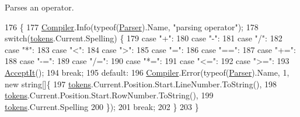 Parses an operator. 
\begin{DoxyCode}
176                                                    \{
177                         \mbox{\hyperlink{namespace_compiler}{Compiler}}.Info(typeof(\mbox{\hyperlink{class_compiler_1_1_parser_a450e11452db3f91ff866fc1e36ebc79d}{Parser}}).Name, \textcolor{stringliteral}{"parsing operator"});
178                         \textcolor{keywordflow}{switch}(\mbox{\hyperlink{class_compiler_1_1_parser_a4db075175c853a197c7b8db7d787a0a5}{tokens}}.Current.Spelling) \{
179                             \textcolor{keywordflow}{case} \textcolor{stringliteral}{"+"}:
180                             \textcolor{keywordflow}{case} \textcolor{stringliteral}{"-"}:
181                             \textcolor{keywordflow}{case} \textcolor{stringliteral}{"/"}:
182                             \textcolor{keywordflow}{case} \textcolor{stringliteral}{"*"}:
183                             \textcolor{keywordflow}{case} \textcolor{stringliteral}{"<"}:
184                             \textcolor{keywordflow}{case} \textcolor{stringliteral}{">"}:
185                             \textcolor{keywordflow}{case} \textcolor{stringliteral}{"="}:
186                             \textcolor{keywordflow}{case} \textcolor{stringliteral}{"=="}:
187                             \textcolor{keywordflow}{case} \textcolor{stringliteral}{"+="}:
188                             \textcolor{keywordflow}{case} \textcolor{stringliteral}{"-="}:
189                             \textcolor{keywordflow}{case} \textcolor{stringliteral}{"/="}:
190                             \textcolor{keywordflow}{case} \textcolor{stringliteral}{"*="}:
191                             \textcolor{keywordflow}{case} \textcolor{stringliteral}{"<="}:
192                             \textcolor{keywordflow}{case} \textcolor{stringliteral}{">="}:
193                                 \mbox{\hyperlink{class_compiler_1_1_parser_ae19e507e1e2460cbad35b03d24402b4f}{AcceptIt}}();
194                                 \textcolor{keywordflow}{break};
195                             \textcolor{keywordflow}{default}:
196                                 \mbox{\hyperlink{namespace_compiler}{Compiler}}.Error(typeof(\mbox{\hyperlink{class_compiler_1_1_parser_a450e11452db3f91ff866fc1e36ebc79d}{Parser}}).Name, 1, \textcolor{keyword}{new} \textcolor{keywordtype}{string}[]\{
197                                     \mbox{\hyperlink{class_compiler_1_1_parser_a4db075175c853a197c7b8db7d787a0a5}{tokens}}.Current.Position.Start.LineNumber.ToString(),
198                                     \mbox{\hyperlink{class_compiler_1_1_parser_a4db075175c853a197c7b8db7d787a0a5}{tokens}}.Current.Position.Start.RowNumber.ToString(),
199                                     \mbox{\hyperlink{class_compiler_1_1_parser_a4db075175c853a197c7b8db7d787a0a5}{tokens}}.Current.Spelling
200                                 \});
201                                 \textcolor{keywordflow}{break};
202                         \}
203                     \}
\end{DoxyCode}
